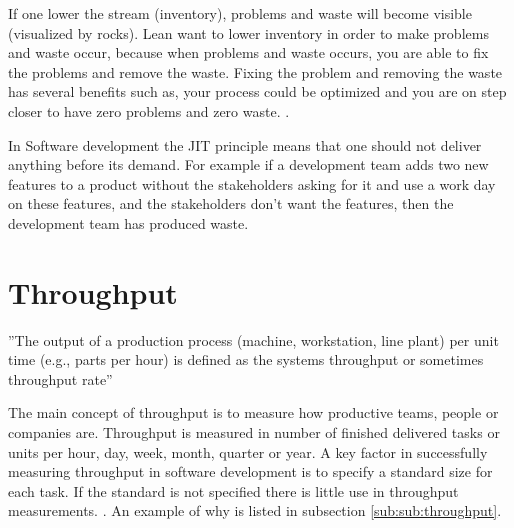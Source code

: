 \documentclass[UKenglish]{ifimaster}  %
\begin{document}
If one lower the stream (inventory), problems and waste will become visible (visualized by rocks). Lean want to lower inventory in order to make problems and waste occur, because when problems and waste occurs, you are able to fix the problems and remove the waste. Fixing the problem and removing the waste has several benefits such as, your process could be optimized and you are on step closer to have zero problems and zero waste.  \parencite{JIT} \parencite{Lean:2006}.

In Software development the JIT principle means that one should not deliver anything before its demand. For example if a development team adds two new features to a product without the stakeholders asking for it and use a work day on these features, and the stakeholders don't want the features, then the development team has produced waste. 

\section{Throughput}
''The output of a production process (machine, workstation, line plant) per unit time (e.g., parts per hour) is defined as the systems throughput or sometimes throughput rate'' \parencite{Adams}

The main concept of throughput is to measure how productive teams, people or companies are. Throughput is measured in number of finished delivered tasks or units per hour, day, week, month, quarter or year. A key factor in successfully measuring throughput in software development is to specify a standard size for each task. If the standard is not specified there is little use in throughput measurements.  \parencite{Throughput}. An example of why is listed in subsection \ref{sub:sub:throughput}. 
\end{document}
